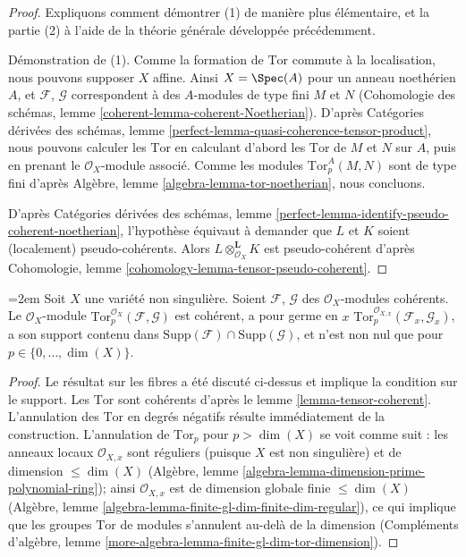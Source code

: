\begin{proof}
Expliquons comment démontrer (1) de manière plus élémentaire, et la partie (2)
à l'aide de la théorie générale développée précédemment.

\medskip\noindent
Démonstration de (1). Comme la formation de $\text{Tor}$ commute à la localisation,
nous pouvons supposer $X$ affine. Ainsi $X = \Spec(A)$ pour un anneau noethérien
$A$, et $\mathcal{F}$, $\mathcal{G}$ correspondent à des $A$-modules de type fini
$M$ et $N$ (Cohomologie des schémas, lemme
\ref{coherent-lemma-coherent-Noetherian}).
D'après Catégories dérivées des schémas, lemme
\ref{perfect-lemma-quasi-coherence-tensor-product}, nous pouvons
calculer les $\text{Tor}$ en calculant d'abord les $\text{Tor}$
de $M$ et $N$ sur $A$, puis en prenant le $\mathcal{O}_X$-module associé.
Comme les modules $\text{Tor}_p^A(M, N)$ sont de type fini d'après
Algèbre, lemme \ref{algebra-lemma-tor-noetherian},
nous concluons.

\medskip\noindent
D'après Catégories dérivées des schémas, lemme
\ref{perfect-lemma-identify-pseudo-coherent-noetherian},
l'hypothèse équivaut à demander que $L$ et $K$ soient
(localement) pseudo-cohérents. Alors $L \otimes_{\mathcal{O}_X}^\mathbf{L} K$
est pseudo-cohérent d'après
Cohomologie, lemme \ref{cohomology-lemma-tensor-pseudo-coherent}.
\end{proof}

\begin{lemma}
\label{lemma-compute-tor-nonsingular}
{\emergencystretch=2em Soit $X$ une variété non singulière.
Soient $\mathcal{F}$, $\mathcal{G}$ des $\mathcal{O}_X$-modules cohérents.
Le $\mathcal{O}_X$-module
$\text{Tor}_p^{\mathcal{O}_X}(\mathcal{F}, \mathcal{G})$
est cohérent, a pour germe en $x$
$\text{Tor}_p^{\mathcal{O}_{X, x}}(\mathcal{F}_x, \mathcal{G}_x)$,
a son support contenu dans
$\text{Supp}(\mathcal{F}) \cap \text{Supp}(\mathcal{G})$, et
n'est non nul que pour $p \in \{0, \ldots, \dim(X)\}$.\par}
\end{lemma}

\begin{proof}
Le résultat sur les fibres a été discuté ci-dessus et implique la condition
sur le support. Les $\text{Tor}$ sont cohérents d'après
le lemme \ref{lemma-tensor-coherent}. L'annulation des $\text{Tor}$
en degrés négatifs résulte immédiatement de la construction. L'annulation
de $\text{Tor}_p$ pour $p > \dim(X)$ se voit comme suit :
les anneaux locaux $\mathcal{O}_{X, x}$ sont réguliers
(puisque $X$ est non singulière) et de dimension $\leq \dim(X)$
(Algèbre, lemme \ref{algebra-lemma-dimension-prime-polynomial-ring});
ainsi $\mathcal{O}_{X, x}$ est de dimension globale finie $\leq \dim(X)$
(Algèbre, lemme \ref{algebra-lemma-finite-gl-dim-finite-dim-regular}),
ce qui implique que les groupes $\text{Tor}$ de modules s'annulent au-delà de la dimension
(Compléments d'algèbre, lemme \ref{more-algebra-lemma-finite-gl-dim-tor-dimension}).
\end{proof}

